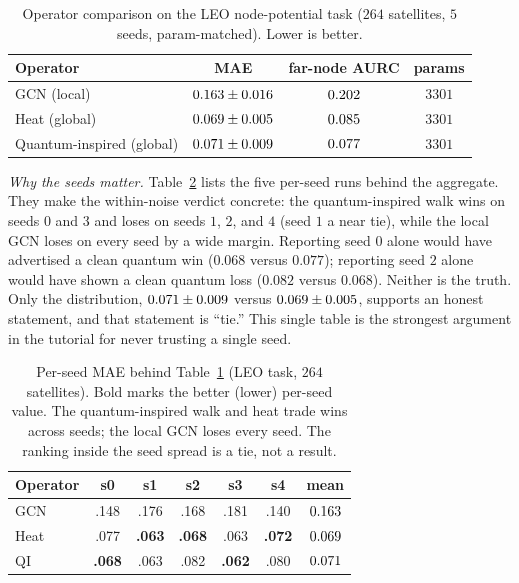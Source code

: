\begin{table}[t]
\centering
\caption{Operator comparison on the LEO node-potential task ($264$ satellites,
$5$ seeds, param-matched). Lower is better.}
\label{tab:operators}
\renewcommand{\arraystretch}{1.2}
\begin{tabular}{@{}lccc@{}}
\toprule
Operator & MAE & far-node AURC & params \\
\midrule
GCN (local)            & $0.163\pm0.016$  & $0.202$ & $3301$ \\
Heat (global)          & $0.069\pm0.005$ & $0.085$ & $3301$ \\
Quantum-inspired (global) & $0.071\pm0.009$  & $0.077$  & $3301$ \\
\bottomrule
\end{tabular}
\end{table}



\textit{Why the seeds matter.} Table~\ref{tab:perseed} lists the five per-seed runs
behind the aggregate. They make the within-noise verdict concrete: the quantum-inspired
walk wins on seeds $0$ and $3$ and loses on seeds $1$, $2$, and $4$ (seed $1$ a near
tie), while the local GCN loses on every seed by a wide margin. Reporting seed $0$ alone
would have advertised a clean quantum win ($0.068$ versus $0.077$); reporting seed $2$
alone would have shown a clean quantum loss ($0.082$ versus $0.068$). Neither is the
truth. Only the
distribution, $0.071\pm0.009$ versus $0.069\pm0.005$, supports an honest
statement, and that statement is ``tie.'' This single table is the strongest argument in
the tutorial for never trusting a single seed.

\begin{table}[t]
\centering
\caption{Per-seed MAE behind Table~\ref{tab:operators} (LEO task, $264$ satellites).
Bold marks the better (lower) per-seed value. The quantum-inspired walk and heat trade
wins across seeds; the local GCN loses every seed. The ranking inside the seed spread is
a tie, not a result.}
\label{tab:perseed}
\renewcommand{\arraystretch}{1.15}
\begin{tabular}{@{}lccccc|c@{}}
\toprule
Operator & s0 & s1 & s2 & s3 & s4 & mean \\
\midrule
GCN  & .148 & .176 & .168 & .181 & .140 & $0.163$ \\
Heat & .077 & \textbf{.063} & \textbf{.068} & .063 & \textbf{.072} & $0.069$ \\
QI   & \textbf{.068} & .063 & .082 & \textbf{.062} & .080 & $0.071$ \\
\bottomrule
\end{tabular}
\end{table}

